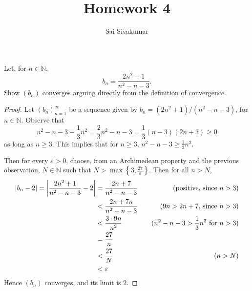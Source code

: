 \documentclass[12pt]{amsart}
\title{Homework 4}
\author{Sai Sivakumar}
\begin{document}
\maketitle

Let, for $n\in \mathbb{N},$
\[
b_n = \frac{2n^2+1}{n^2-n-3}.
\]
Show  $(b_n)$ converges arguing  directly from the definition of convergence.

\begin{proof}
Let $(b_n)_{n=1}^{\infty}$ be a sequence given by $b_n = (2n^2+1)/(n^2-n-3)$, for $n\in\mathbb{N}$. Observe that \[n^2-n-3-\frac{1}{3}n^2  = \frac{2}{3}n^2-n-3 = \frac{1}{3}(n-3)(2n+3) \geq 0\] as long as $n\geq 3$. This implies that for $n\geq 3$, $n^2-n-3 \geq \frac{1}{3}n^2.$

Then for every $\varepsilon>0$, choose, from an Archimedean property and the previous observation, $N\in \mathbb{N}$ such that $N > \max\left\{3, \frac{27}{\varepsilon}\right\}$. Then for all $n>N$, \begin{align*}
    \abs{b_n-2} = \abs{\frac{2n^2+1}{n^2-n-3} -2} &= \frac{2n+7}{n^2-n-3}&\quad (\text{positive, since }n > 3)\\
    &< \frac{2n+7n}{n^2-n-3} &\quad (9n > 2n+7 \text{, since }n > 3) \\
    &< \frac{3\cdot 9n}{n^2} &\quad (n^2-n-3 > \frac{1}{3}n^2 \text{ for }n > 3) \\
    &= \frac{27}{n}\\
    &< \frac{27}{N}&\quad (n > N)\\
    &< \varepsilon
\end{align*}
Hence $(b_n)$ converges, and its limit is $2$.
\end{proof}
\end{document}
